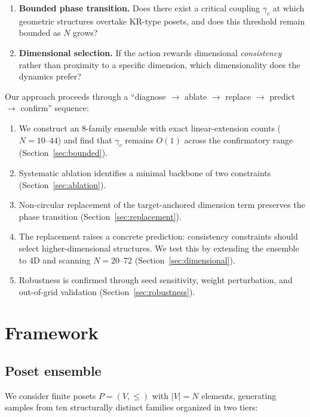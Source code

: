 \documentclass[12pt,a4paper]{article}
\begin{document}
\begin{enumerate}[nosep]
\item \textbf{Bounded phase transition.} Does there exist a critical coupling
$\gamma_c$ at which geometric structures overtake KR-type posets, and does this
threshold remain bounded as $N$ grows?
\item \textbf{Dimensional selection.} If the action rewards dimensional
\emph{consistency} rather than proximity to a specific dimension, which
dimensionality does the dynamics prefer?
\end{enumerate}

Our approach proceeds through a ``diagnose $\to$ ablate $\to$ replace $\to$
predict $\to$ confirm'' sequence:

\begin{enumerate}[nosep]
\item We construct an 8-family ensemble with exact linear-extension counts ($N = 10$--$44$) and
find that $\gamma_c$ remains $O(1)$ across the confirmatory range
(Section~\ref{sec:bounded}).
\item Systematic ablation identifies a minimal backbone of two constraints
(Section~\ref{sec:ablation}).
\item Non-circular replacement of the target-anchored dimension term preserves
the phase transition (Section~\ref{sec:replacement}).
\item The replacement raises a concrete prediction: consistency constraints
should select higher-dimensional structures. We test this by extending the
ensemble to 4D and scanning $N = 20$--$72$
(Section~\ref{sec:dimensional}).
\item Robustness is confirmed through seed sensitivity, weight perturbation, and
out-of-grid validation (Section~\ref{sec:robustness}).
\end{enumerate}

\section{Framework}
\label{sec:framework}

\subsection{Poset ensemble}
\label{sec:ensemble}

We consider finite posets $P = (V, \leq)$ with $|V| = N$ elements, generating
samples from ten structurally distinct families organized in two tiers:
\end{document}
